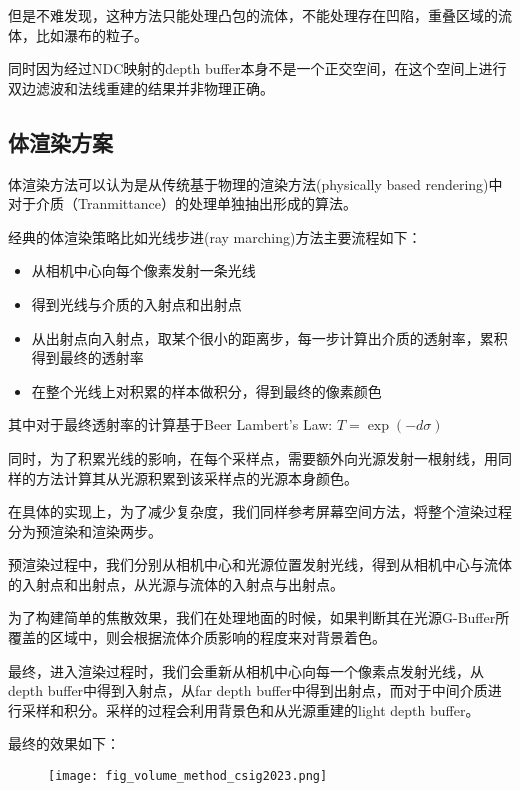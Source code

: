 但是不难发现，这种方法只能处理凸包的流体，不能处理存在凹陷，重叠区域的流体，比如瀑布的粒子。

同时因为经过NDC映射的depth buffer本身不是一个正交空间，在这个空间上进行双边滤波和法线重建的结果并非物理正确。

\subsection{体渲染方案}

体渲染方法可以认为是从传统基于物理的渲染方法(physically based rendering)中对于介质（Tranmittance）的处理单独抽出形成的算法。

经典的体渲染策略比如光线步进(ray marching)方法主要流程如下：

\begin{itemize}
	\item 从相机中心向每个像素发射一条光线
	\item 得到光线与介质的入射点和出射点
	\item 从出射点向入射点，取某个很小的距离步，每一步计算出介质的透射率，累积得到最终的透射率
	\item 在整个光线上对积累的样本做积分，得到最终的像素颜色
\end{itemize}

其中对于最终透射率的计算基于Beer Lambert's Law: $T=\exp(-d\sigma)$

同时，为了积累光线的影响，在每个采样点，需要额外向光源发射一根射线，用同样的方法计算其从光源积累到该采样点的光源本身颜色。

在具体的实现上，为了减少复杂度，我们同样参考屏幕空间方法，将整个渲染过程分为预渲染和渲染两步。

预渲染过程中，我们分别从相机中心和光源位置发射光线，得到从相机中心与流体的入射点和出射点，从光源与流体的入射点与出射点。

为了构建简单的焦散效果，我们在处理地面的时候，如果判断其在光源G-Buffer所覆盖的区域中，则会根据流体介质影响的程度来对背景着色。

最终，进入渲染过程时，我们会重新从相机中心向每一个像素点发射光线，从depth buffer中得到入射点，从far depth buffer中得到出射点，而对于中间介质进行采样和积分。采样的过程会利用背景色和从光源重建的light depth buffer。

最终的效果如下：

\begin{figure}[H]
	\centering
	\texttt{[image: fig\_volume\_method\_csig2023.png]}
\end{figure}

